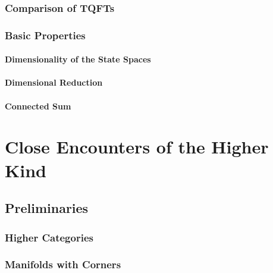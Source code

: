 \documentclass[a4paper,11pt,psamsfonts,reqno]{amsbook}
\newcounter{prpcounter}
\theoremstyle{proposition}
\theoremstyle{proof}
\begin{document}
\section{Comparison of TQFTs}
\label{sec:comparison}



\section{Basic Properties}
\label{sec:basprop}


\subsection{Dimensionality of the State Spaces}
\label{subsec:dim}


\subsection{Dimensional Reduction}
\label{subsec:dimred}


\subsection{Connected Sum}
\label{subsec:consum}





\part{Close Encounters of the Higher Kind}
\label{part:higher}





\chapter{Preliminaries}
\label{chap:prelim2}



\section{Higher Categories}
\label{sec:highcat}



\section{Manifolds with Corners}
\label{sec:mancorn}

\end{document}
